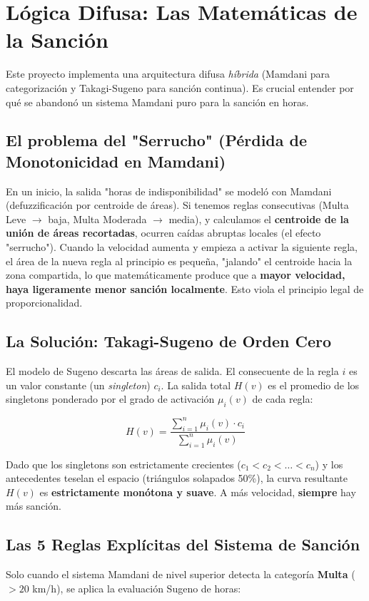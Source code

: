 \documentclass[11pt,a4paper]{article}
\begin{document}
\section{L\'ogica Difusa: Las Matem\'aticas de la Sanci\'on}

Este proyecto implementa una arquitectura difusa \emph{h\'ibrida} (Mamdani para categorizaci\'on y Takagi-Sugeno para sanci\'on continua). Es crucial entender por qu\'e se abandon\'o un sistema Mamdani puro para la sanci\'on en horas.

\subsection{El problema del "Serrucho" (P\'erdida de Monotonicidad en Mamdani)}
En un inicio, la salida "horas de indisponibilidad" se model\'o con Mamdani (defuzzificaci\'on por centroide de \'areas).
Si tenemos reglas consecutivas (Multa Leve $\rightarrow$ baja, Multa Moderada $\rightarrow$ media), y calculamos el \textbf{centroide de la uni\'on de \'areas recortadas}, ocurren ca\'idas abruptas locales (el efecto "serrucho").
Cuando la velocidad aumenta y empieza a activar la siguiente regla, el \'area de la nueva regla al principio es peque\~na, "jalando" el centroide hacia la zona compartida, lo que matem\'aticamente produce que a \textbf{mayor velocidad, haya ligeramente menor sanci\'on localmente}. Esto viola el principio legal de proporcionalidad.

\subsection{La Soluci\'on: Takagi-Sugeno de Orden Cero}
El modelo de Sugeno descarta las \'areas de salida. El consecuente de la regla $i$ es un valor constante (un \emph{singleton}) $c_i$. La salida total $H(v)$ es el promedio de los singletons ponderado por el grado de activaci\'on $\mu_i(v)$ de cada regla:

\[
H(v) = \frac{\sum_{i=1}^{n} \mu_i(v) \cdot c_i}{\sum_{i=1}^{n} \mu_i(v)}
\]

Dado que los singletons son estrictamente crecientes ($c_1 < c_2 < \dots < c_n$) y los antecedentes teselan el espacio (tri\'angulos solapados 50\%), la curva resultante $H(v)$ es \textbf{estrictamente mon\'otona y suave}. A m\'as velocidad, \textbf{siempre} hay m\'as sanci\'on.

\subsection{Las 5 Reglas Expl\'icitas del Sistema de Sanci\'on}
Solo cuando el sistema Mamdani de nivel superior detecta la categor\'ia \textbf{Multa} ($>20$ km/h), se aplica la evaluaci\'on Sugeno de horas:
\end{document}
